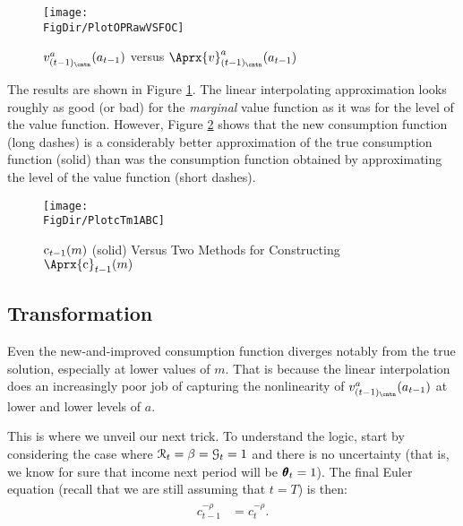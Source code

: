 \documentclass[titlepage, headings=optiontotocandhead]{Resources/texmf-local/tex/latex/econtex}
\begin{document}
\hypertarget{PlotOPRawVSFOC}{}
\begin{figure}
  \centerline{\texttt{[image: \\FigDir/PlotOPRawVSFOC]}}
  \caption{$v_{({t-1})_\cntn}^{a}(a_{t-1})$ versus $\Aprx{v}_{({t-1})_\cntn}^{a}(a_{t-1})$}
  \label{fig:PlotOPRawVSFOC}
\end{figure}


The results are shown in Figure \ref{fig:PlotOPRawVSFOC}.  The linear interpolating approximation looks roughly as good (or bad) for the \textit{marginal} value function as it was for the level of the value function. However, Figure \ref{fig:PlotcTm1ABC} shows that the new consumption function (long dashes) is a considerably better approximation of the true consumption function (solid) than was the consumption function obtained by approximating the level of the value function (short dashes).

\hypertarget{PlotcTm1ABC}{}
\begin{figure}
  \centerline{\texttt{[image: \\FigDir/PlotcTm1ABC]}}
  \caption{$\mathrm{c}_{t-1}(m)$ (solid) Versus Two Methods for Constructing $\Aprx{\cFunc}_{t-1}(m)$}
  \label{fig:PlotcTm1ABC}
\end{figure}

\hypertarget{transformation}{}
\subsection{Transformation}\label{subsec:transformation}

Even the new-and-improved consumption function diverges notably from the true
solution, especially at lower values of $m$.  That is because the
linear interpolation does an increasingly poor job of capturing the
nonlinearity of $v_{({t-1})_\cntn}^{a}(a_{t-1})$ at
lower and lower levels of $a$.

This is where we unveil our next trick.  To understand the logic,
start by considering the case where $\mathcal{R}_{t} = \beta =
\mathcal{G}_{t} = 1$ and there is no uncertainty
(that is, we know for sure that income next period
will be $\pmb{\theta}_{t} = 1$).  The final Euler equation (recall that we are still assuming that $t=T$) is then:
\begin{equation}\begin{gathered}\begin{aligned}
      c_{t-1}^{-\rho}  & = c_{t}^{-\rho}.
    \end{aligned}\end{gathered}\end{equation}
\end{document}

